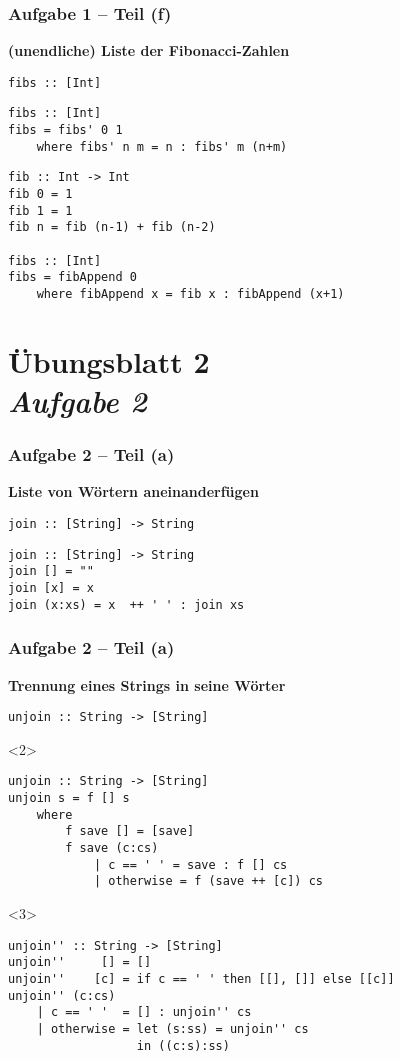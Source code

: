 \documentclass{beamer}
\begin{document}
\begin{frame}[t, fragile] \frametitle{Aufgabe 1 -- Teil (f)}
	\textbf{(unendliche) Liste der Fibonacci-Zahlen}
	
	\texttt{fibs :: [Int]}
	
	\pause \bigskip
	\begin{lstlisting}
fibs :: [Int]
fibs = fibs' 0 1
	where fibs' n m = n : fibs' m (n+m)
	\end{lstlisting}
	\pause
	\begin{lstlisting}
fib :: Int -> Int
fib 0 = 1
fib 1 = 1
fib n = fib (n-1) + fib (n-2)
	
fibs :: [Int]
fibs = fibAppend 0
	where fibAppend x = fib x : fibAppend (x+1)
	\end{lstlisting}
\end{frame}


\section{Übungsblatt 2 \\ \textit{\normalsize Aufgabe 2}}

\begin{frame}[t, fragile] \frametitle{Aufgabe 2 -- Teil (a)}
	\textbf{Liste von Wörtern aneinanderfügen}
	
	\texttt{join :: [String] -> String}
	
	\pause \bigskip
	
	\begin{lstlisting}
join :: [String] -> String
join [] = ""
join [x] = x
join (x:xs) = x  ++ ' ' : join xs
	\end{lstlisting}
\end{frame}

\begin{frame}[t, fragile] \frametitle{Aufgabe 2 -- Teil (a)}
	\textbf{Trennung eines Strings in seine Wörter}
	
	\texttt{unjoin :: String -> [String]}
	
	\bigskip
	
	\begin{onlyenv}
		\begin{lstlisting}
unjoin :: String -> [String]
unjoin s = f [] s
	where
		f save [] = [save]
		f save (c:cs)
			| c == ' ' = save : f [] cs
			| otherwise = f (save ++ [c]) cs
		\end{lstlisting}
	\end{onlyenv}
	
	\begin{onlyenv}
		\begin{lstlisting}
unjoin'' :: String -> [String]
unjoin''     [] = []
unjoin''    [c] = if c == ' ' then [[], []] else [[c]]
unjoin'' (c:cs)
	| c == ' '  = [] : unjoin'' cs
	| otherwise = let (s:ss) = unjoin'' cs
			      in ((c:s):ss)
		\end{lstlisting}
	\end{onlyenv}
\end{frame}
\end{document}
